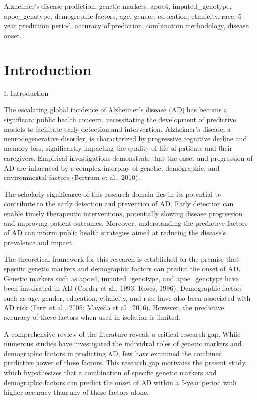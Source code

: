 \documentclass[conference]{IEEEtran}
\begin{document}
\begin{IEEEkeywords}
Alzheimer's disease prediction, genetic markers, apoe4, imputed_genotype, apoe_genotype, demographic factors, age, gender, education, ethnicity, race, 5-year prediction period, accuracy of prediction, combination methodology, disease onset.
\end{IEEEkeywords}

\section{Introduction}
I. Introduction

The escalating global incidence of Alzheimer's disease (AD) has become a significant public health concern, necessitating the development of predictive models to facilitate early detection and intervention. Alzheimer's disease, a neurodegenerative disorder, is characterized by progressive cognitive decline and memory loss, significantly impacting the quality of life of patients and their caregivers. Empirical investigations demonstrate that the onset and progression of AD are influenced by a complex interplay of genetic, demographic, and environmental factors (Bertram et al., 2010). 

The scholarly significance of this research domain lies in its potential to contribute to the early detection and prevention of AD. Early detection can enable timely therapeutic interventions, potentially slowing disease progression and improving patient outcomes. Moreover, understanding the predictive factors of AD can inform public health strategies aimed at reducing the disease's prevalence and impact.

The theoretical framework for this research is established on the premise that specific genetic markers and demographic factors can predict the onset of AD. Genetic markers such as apoe4, imputed_genotype, and apoe_genotype have been implicated in AD (Corder et al., 1993; Roses, 1996). Demographic factors such as age, gender, education, ethnicity, and race have also been associated with AD risk (Ferri et al., 2005; Mayeda et al., 2016). However, the predictive accuracy of these factors when used in isolation is limited.

A comprehensive review of the literature reveals a critical research gap. While numerous studies have investigated the individual roles of genetic markers and demographic factors in predicting AD, few have examined the combined predictive power of these factors. This research gap motivates the present study, which hypothesizes that a combination of specific genetic markers and demographic factors can predict the onset of AD within a 5-year period with higher accuracy than any of these factors alone.
\end{document}
